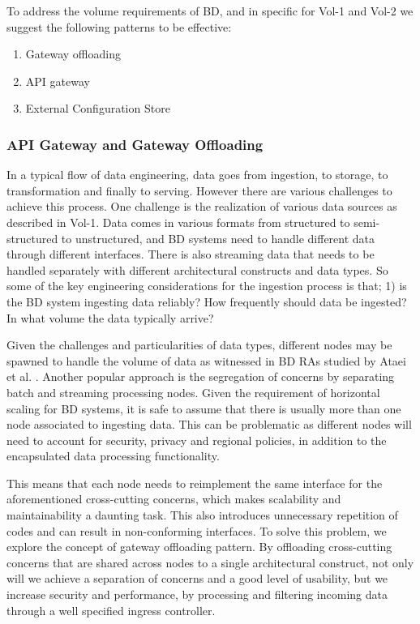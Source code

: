 \documentclass{bmcart}
\begin{document}
To address the volume requirements of BD, and in specific for Vol-1 and Vol-2 we suggest the following patterns to be effective:

\begin{enumerate}
  \item Gateway offloading
  \item API gateway
  \item External Configuration Store
\end{enumerate}

\subsubsection{API Gateway and Gateway Offloading}

In a typical flow of data engineering, data goes from ingestion, to storage, to transformation and finally to serving. However there are various challenges to achieve this process. One challenge is the realization of various data sources as described in Vol-1. Data comes in various formats from structured to semi-structured to unstructured, and BD systems need to handle different data through different interfaces. There is also streaming data that needs to be handled separately with different architectural constructs and data types. So some of the key engineering considerations for the ingestion process is that; 1) is the BD system ingesting data reliably? How frequently should data be ingested? In what volume the data typically arrive?

Given the challenges and particularities of data types, different nodes may be spawned to handle the volume of data as witnessed in BD RAs studied by Ataei et al. \cite{ataei2020big}. Another popular approach is the segregation of concerns by separating batch and streaming processing nodes. Given the requirement of horizontal scaling for BD systems, it is safe to assume that there is usually more than one node associated to ingesting data. This can be problematic as different nodes will need to account for security, privacy and regional policies, in addition to the encapsulated data processing functionality. 

This means that each node needs to reimplement the same interface for the aforementioned cross-cutting concerns, which makes scalability and maintainability a daunting task. This also introduces unnecessary repetition of codes and can result in non-conforming interfaces. To solve this problem, we explore the concept of gateway offloading pattern. By offloading cross-cutting concerns that are shared across nodes to a single architectural construct, not only will we achieve a separation of concerns and a good level of usability, but we increase security and performance, by processing and filtering incoming data through a well specified ingress controller.
\end{document}
